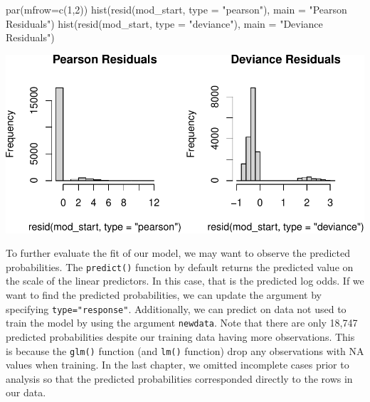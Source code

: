 \documentclass[
  letterpaper,
]{latex/krantz}
\makeatletter
\newenvironment{Shaded}{\begin{snugshade}}{\end{snugshade}}
\newcommand{\AttributeTok}[1]{\textcolor[rgb]{0.40,0.45,0.13}{#1}}
\newcommand{\DecValTok}[1]{\textcolor[rgb]{0.68,0.00,0.00}{#1}}
\newcommand{\FunctionTok}[1]{\textcolor[rgb]{0.28,0.35,0.67}{#1}}
\newcommand{\NormalTok}[1]{\textcolor[rgb]{0.00,0.23,0.31}{#1}}
\newcommand{\StringTok}[1]{\textcolor[rgb]{0.13,0.47,0.30}{#1}}
\newenvironment{kframe}{%
\medskip{}
\setlength{\fboxsep}{.8em}
 \def\at@end@of@kframe{}%
 \ifinner\ifhmode%
  \def\at@end@of@kframe{\end{minipage}}%
  \begin{minipage}{\columnwidth}%
 \fi\fi%
 \def\FrameCommand##1{\hskip\@totalleftmargin \hskip-\fboxsep
 \colorbox{shadecolor}{##1}\hskip-\fboxsep
     \hskip-\linewidth \hskip-\@totalleftmargin \hskip\columnwidth}%
 \MakeFramed {\advance\hsize-\width
   \@totalleftmargin\z@ \linewidth\hsize
   \@setminipage}}%
 {\par\unskip\endMakeFramed%
 \at@end@of@kframe}
\renewenvironment{Shaded}{\begin{kframe}}{\end{kframe}}
\makeatother
\begin{document}
\begin{Shaded}
\begin{Highlighting}[]
\FunctionTok{par}\NormalTok{(}\AttributeTok{mfrow=}\FunctionTok{c}\NormalTok{(}\DecValTok{1}\NormalTok{,}\DecValTok{2}\NormalTok{))}
\FunctionTok{hist}\NormalTok{(}\FunctionTok{resid}\NormalTok{(mod\_start, }\AttributeTok{type =} \StringTok{"pearson"}\NormalTok{), }\AttributeTok{main =} \StringTok{"Pearson Residuals"}\NormalTok{)}
\FunctionTok{hist}\NormalTok{(}\FunctionTok{resid}\NormalTok{(mod\_start, }\AttributeTok{type =} \StringTok{"deviance"}\NormalTok{), }\AttributeTok{main =} \StringTok{"Deviance Residuals"}\NormalTok{)}
\end{Highlighting}
\end{Shaded}

\begin{center}
\includegraphics[width=1\textwidth,height=\textheight]{book/logistic_regression_files/figure-pdf/unnamed-chunk-7-1.pdf}
\end{center}

\newpage

To further evaluate the fit of our model, we may want to observe the
predicted probabilities. The
\texttt{predict()}
function by default returns the predicted value on the scale of the
linear predictors. In this case, that is the predicted log odds. If we
want to find the predicted probabilities, we can update the argument by
specifying \texttt{type="response"}. Additionally, we can predict on
data not used to train the model by using the argument \texttt{newdata}.
Note that there are only 18,747 predicted probabilities despite our
training data having more observations. This is because the
\texttt{glm()} function (and \texttt{lm()} function) drop any
observations with NA values when training. In the last chapter, we
omitted incomplete cases prior to analysis so that the predicted
probabilities corresponded directly to the rows in our data.
\end{document}
